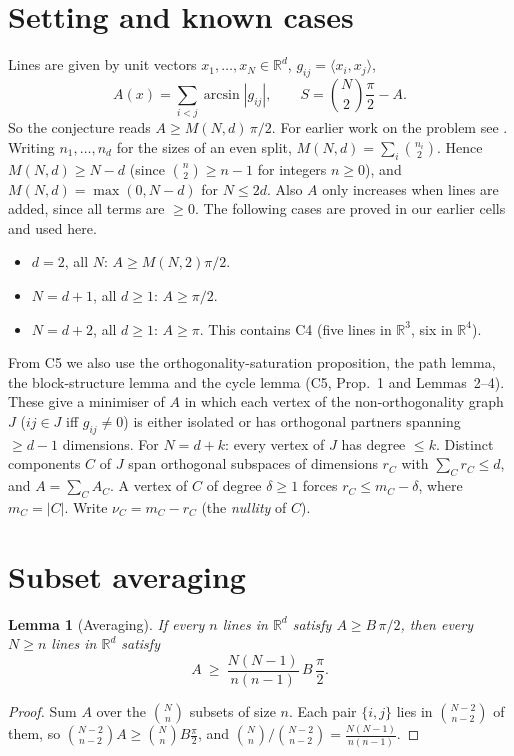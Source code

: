 \documentclass[11pt]{article}
\newtheorem{lemma}[theorem]{Lemma}
\theoremstyle{remark}
\begin{document}
\section{Setting and known cases}
Lines are given by unit vectors $x_1,\dots,x_N\in\mathbb R^d$, $g_{ij}=\langle x_i,x_j\rangle$,
\[
A(x)=\sum_{i<j}\arcsin|g_{ij}|,\qquad S=\binom N2\frac\pi2-A .
\]
So the conjecture reads $A\ge M(N,d)\,\pi/2$. For earlier work on the problem see \cite{FVZ16,BM19}. Writing $n_1,\dots,n_d$ for the sizes of an even split,
$M(N,d)=\sum_i\binom{n_i}2$. Hence $M(N,d)\ge N-d$ (since $\binom n2\ge n-1$ for integers
$n\ge0$), and $M(N,d)=\max(0,N-d)$ for $N\le 2d$. Also $A$ only increases when lines are added, since all
terms are $\ge0$. The following cases are proved in our earlier cells and used here.
\begin{itemize}
\item[(C1)] $d=2$, all $N$: $A\ge M(N,2)\pi/2$.
\item[(C3)] $N=d+1$, all $d\ge1$: $A\ge\pi/2$.
\item[(C5)] $N=d+2$, all $d\ge1$: $A\ge\pi$. This contains C4 (five lines in $\mathbb R^3$, six in
  $\mathbb R^4$).
\end{itemize}
From C5 we also use the orthogonality-saturation proposition, the path lemma, the block-structure
lemma and the cycle lemma (C5, Prop.~1 and Lemmas~2--4). These give a minimiser of $A$ in which each
vertex of the non-orthogonality graph $J$ ($ij\in J$ iff $g_{ij}\ne0$) is either isolated or has
orthogonal partners spanning $\ge d-1$ dimensions. For $N=d+k$: every vertex of $J$ has degree
$\le k$. Distinct components $C$ of $J$ span orthogonal subspaces of dimensions $r_C$ with
$\sum_Cr_C\le d$, and $A=\sum_CA_C$. A vertex of $C$ of degree $\delta\ge1$ forces
$r_C\le m_C-\delta$, where $m_C=|C|$. Write $\nu_C=m_C-r_C$ (the \emph{nullity} of $C$).

\section{Subset averaging}

\begin{lemma}[Averaging]\label{lem:avg}
If every $n$ lines in $\mathbb R^d$ satisfy $A\ge B\,\pi/2$, then every $N\ge n$ lines in
$\mathbb R^d$ satisfy
\[
A\ \ge\ \frac{N(N-1)}{n(n-1)}\,B\,\frac\pi2 .
\]
\end{lemma}
\begin{proof}
Sum $A$ over the $\binom Nn$ subsets of size $n$. Each pair $\{i,j\}$ lies in $\binom{N-2}{n-2}$
of them, so $\binom{N-2}{n-2}A\ge\binom NnB\frac\pi2$, and
$\binom Nn/\binom{N-2}{n-2}=\frac{N(N-1)}{n(n-1)}$.
\end{proof}
\end{document}
